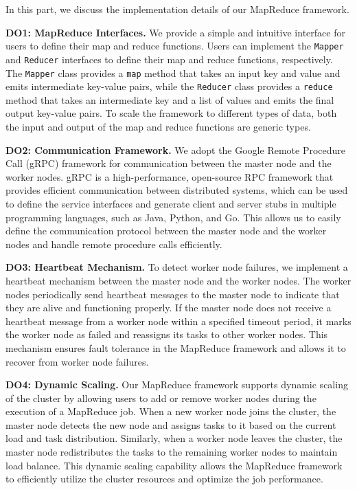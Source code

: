 In this part, we discuss the implementation details of our MapReduce framework. 

\textbf{DO1: MapReduce Interfaces.} We provide a simple and intuitive interface for users to define their map and reduce functions. Users can implement the \texttt{Mapper} and \texttt{Reducer} interfaces to define their map and reduce functions, respectively. The \texttt{Mapper} class provides a \texttt{map} method that takes an input key and value and emits intermediate key-value pairs, while the \texttt{Reducer} class provides a \texttt{reduce} method that takes an intermediate key and a list of values and emits the final output key-value pairs. To scale the framework to different types of data, both the input and output of the map and reduce functions are generic types.

\textbf{DO2: Communication Framework.} We adopt the Google Remote Procedure Call (gRPC) framework for communication between the master node and the worker nodes. gRPC is a high-performance, open-source RPC framework that provides efficient communication between distributed systems, which can be used to define the service interfaces and generate client and server stubs in multiple programming languages, such as Java, Python, and Go. This allows us to easily define the communication protocol between the master node and the worker nodes and handle remote procedure calls efficiently.

\textbf{DO3: Heartbeat Mechanism.} To detect worker node failures, we implement a heartbeat mechanism between the master node and the worker nodes. The worker nodes periodically send heartbeat messages to the master node to indicate that they are alive and functioning properly. If the master node does not receive a heartbeat message from a worker node within a specified timeout period, it marks the worker node as failed and reassigns its tasks to other worker nodes. This mechanism ensures fault tolerance in the MapReduce framework and allows it to recover from worker node failures.

\textbf{DO4: Dynamic Scaling.} Our MapReduce framework supports dynamic scaling of the cluster by allowing users to add or remove worker nodes during the execution of a MapReduce job. When a new worker node joins the cluster, the master node detects the new node and assigns tasks to it based on the current load and task distribution. Similarly, when a worker node leaves the cluster, the master node redistributes the tasks to the remaining worker nodes to maintain load balance. This dynamic scaling capability allows the MapReduce framework to efficiently utilize the cluster resources and optimize the job performance.

